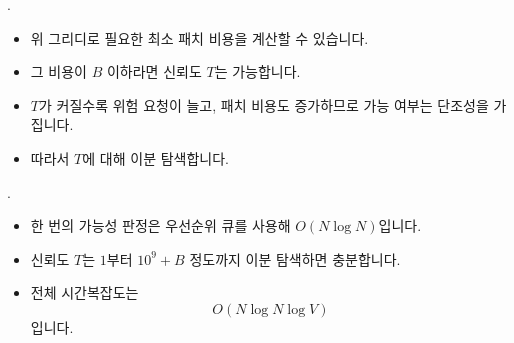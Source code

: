 \begin{frame}{\probno{}. \probtitle{}}
    \begin{itemize}
        \item 위 그리디로 필요한 최소 패치 비용을 계산할 수 있습니다.
        \item 그 비용이 $B$ 이하라면 신뢰도 $T$는 가능합니다.
        \item $T$가 커질수록 위험 요청이 늘고, 패치 비용도 증가하므로 가능 여부는 단조성을 가집니다.
        \item 따라서 $T$에 대해 이분 탐색합니다.
    \end{itemize}
\end{frame}

\begin{frame}{\probno{}. \probtitle{}}
    \begin{itemize}
        \item 한 번의 가능성 판정은 우선순위 큐를 사용해 $O(N \log N)$입니다.
        \item 신뢰도 $T$는 $1$부터 $10^9+B$ 정도까지 이분 탐색하면 충분합니다.
        \item 전체 시간복잡도는
        \[
            O(N \log N \log V)
        \]
        입니다.
    \end{itemize}
\end{frame}